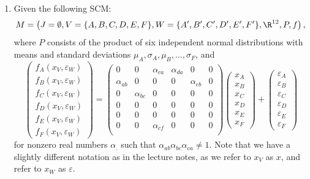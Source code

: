 \begin{enumerate}[label=11.\arabic*]
	\item %
	Given the following SCM:
	$$M = \left( J=\emptyset, V=\{A, B, C, D, E, F\}, W=\{A', B', C', D', E', F'\}, \R^{12}, P, f \right),$$
	where $P$ consists of the product of six independent normal distributions with means and standard deviations $\mu_A, \sigma_A, \mu_B, ..., \sigma_F$, and
	\[
		\begin{pmatrix}
			f_A(x_V, \varepsilon_W) \\ f_B(x_V, \varepsilon_W) \\ f_C(x_V, \varepsilon_W) \\ f_D(x_V, \varepsilon_W) \\ f_E(x_V, \varepsilon_W) \\ f_F(x_V, \varepsilon_W)
		\end{pmatrix}
		=
		\begin{pmatrix}
			0           & 0           & \alpha_{ca} & \alpha_{da} & 0           & 0 \\
			\alpha_{ab} & 0           & 0           & 0           & \alpha_{eb} & 0 \\
			0           & \alpha_{bc} & 0           & 0           & 0           & 0 \\
			0           & 0           & 0           & 0           & 0           & 0 \\
			0           & 0           & 0           & 0           & 0           & 0 \\
			0           & 0           & \alpha_{cf} & 0           & 0           & 0 \\
		\end{pmatrix}
		\begin{pmatrix}
			x_A \\ x_B \\ x_C \\ x_D \\ x_E \\ x_F
		\end{pmatrix}
		+
		\begin{pmatrix}
			\varepsilon_A \\ \varepsilon_B \\ \varepsilon_C \\ \varepsilon_D \\ \varepsilon_E \\ \varepsilon_F
		\end{pmatrix}
	\]
	for nonzero real numbers $\alpha_.$ such that $\alpha_{ab}\alpha_{bc}\alpha_{ca} \neq 1$. Note that we have a slightly different notation as in the lecture notes, as we refer to $x_V$ as $x$, and refer to $x_W$ as $\varepsilon$.

\end{enumerate}
